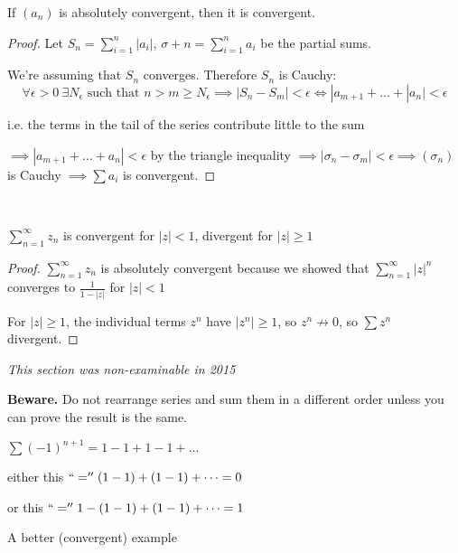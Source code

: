 \begin{theorem}
	If $(a_n)$ is absolutely convergent, then it is convergent.
\end{theorem}

\begin{proof}
Let $S_n = \sum_{i=1}^{n} |a_i|$, $\sigma+n = \sum_{i=1}^n a_i$ be the partial sums.

We're assuming that $S_n$ converges. Therefore $S_n$ is Cauchy: \[ \forall \epsilon >0~ \exists N_{\epsilon}\text{ such that }n > m \geq N_{\epsilon} \implies |S_n - S_m| < \epsilon \iff |a_{m+1} + \dots + |a_n| < \epsilon\]

i.e. the terms in the tail of the series contribute little to the sum 

$\implies |a_{m+1} + \dots + a_n| < \epsilon$ by the triangle inequality $\implies |\sigma_n - \sigma_m| < \epsilon \implies (\sigma_n)$ is Cauchy $\implies \sum a_i$ is convergent.
\end{proof}~

\begin{example}
$\sum_{n=1}^{\infty} z_n$ is convergent for $|z| < 1$, divergent for $|z| \geq 1$
\begin{proof}
$\sum_{n=1}^{\infty} z_n$ is absolutely convergent because we showed that $\sum_{n=1}^{\infty} |z|^n$ converges to $\frac{1}{1 - |z|}$ for $|z| < 1$	

For $|z| \geq 1$, the individual terms $z^n$ have $|z^n| \geq 1$, so $z^n \not\to 0$, so $\sum z^n$ divergent.
\end{proof}
\end{example}


\emph{This section was non-examinable in 2015}

\textbf{Beware.} Do not rearrange series and sum them in a different order unless you can prove the result is the same.

\begin{example}
$\sum (-1)^{n+1} = 1 - 1 + 1 - 1 + \dots$

either this $``='' (1-1) + (1-1) + \dots = 0$

or this $``='' 1 - (1-1) + (1-1) + \dots = 1$	
\end{example}

A better (convergent) example\\

